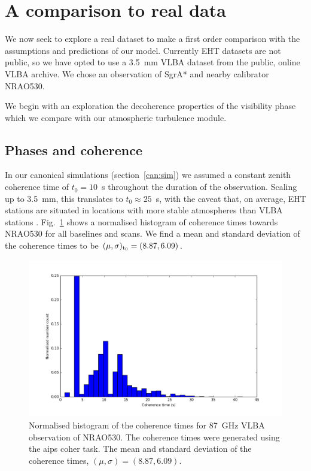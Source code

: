 
\section{A comparison to real data}

We now seek to explore a real dataset to make a first order comparison with the assumptions and predictions of our model. Currently EHT datasets are not public, so we have opted to use a 3.5~mm VLBA dataset from the public, online VLBA archive. We chose an observation of SgrA* and nearby calibrator NRAO530. 

We begin with an exploration the decoherence properties of the visibility phase which we compare with our atmospheric turbulence module. 


\subsection{Phases and coherence}

In our canonical simulations (section~\ref{can:sim}) we assumed a constant zenith coherence time of $t_0 = 10$~s throughout the duration of the observation.  Scaling up to 3.5~mm, this translates to $t_0 \approx 25$~s, with the caveat that, on average, EHT stations are situated in locations with more stable atmospheres than VLBA stations . Fig.~\ref{fig:coherence} shows a normalised histogram of coherence times towards NRAO530 for all baselines and scans. We find a mean and standard deviation of the coherence times to be $(\mu, \sigma)_{\rm t_0} = (8.87,6.09)$.

\begin{figure}
\begin{center}
\includegraphics[width=\columnwidth]{Images/Coherence_time_NRAO530ff}
\caption{Normalised histogram of the coherence times for 87~GHz VLBA observation of NRAO530. The coherence times were generated using the {\sc aips} {\sc coher} task. The mean and standard deviation of the coherence times, $(\mu, \sigma) = (8.87,6.09)$. \label{fig:coherence}%
}
\end{center}
\end{figure}


